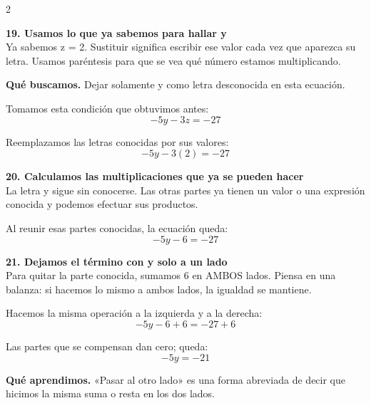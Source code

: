 \documentclass[11pt,a4paper,landscape]{article}
\begin{document}
\begin{multicols*}{2}
\noindent\begin{minipage}{\linewidth}\textbf{19. Usamos lo que ya sabemos para hallar y}\\[2pt]Ya sabemos z = 2. Sustituir significa escribir ese valor cada vez que aparezca su letra. Usamos paréntesis para que se vea qué número estamos multiplicando.
\par\smallskip\textbf{Qué buscamos.} Dejar solamente y como letra desconocida en esta ecuación.
\par\smallskip Tomamos esta condición que obtuvimos antes:
\[-5y - 3z = -27\]
\par\smallskip Reemplazamos las letras conocidas por sus valores:
\[-5y - 3\left(2\right)=-27\]
\end{minipage}\par\medskip
\noindent\begin{minipage}{\linewidth}\textbf{20. Calculamos las multiplicaciones que ya se pueden hacer}\\[2pt]La letra y sigue sin conocerse. Las otras partes ya tienen un valor o una expresión conocida y podemos efectuar sus productos.
\par{}\par\smallskip
\par\smallskip Al reunir esas partes conocidas, la ecuación queda:
\[-5y - 6=-27\]
\end{minipage}\par\medskip
\noindent\begin{minipage}{\linewidth}\textbf{21. Dejamos el término con y solo a un lado}\\[2pt]Para quitar la parte conocida, sumamos 6 en AMBOS lados. Piensa en una balanza: si hacemos lo mismo a ambos lados, la igualdad se mantiene.
\par\smallskip Hacemos la misma operación a la izquierda y a la derecha:
\[-5y - 6 + 6=-27 + 6\]
\par\smallskip Las partes que se compensan dan cero; queda:
\[-5y=-21\]
\par\smallskip\textbf{Qué aprendimos.} «Pasar al otro lado» es una forma abreviada de decir que hicimos la misma suma o resta en los dos lados.

\end{minipage}
\end{multicols*}
\end{document}
